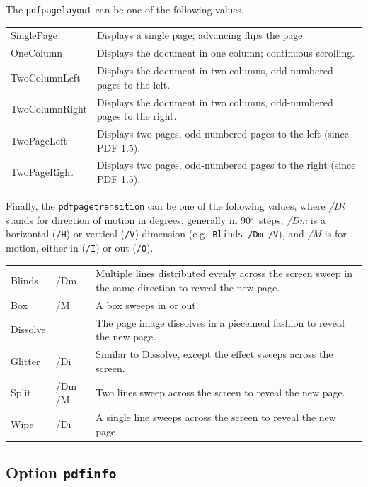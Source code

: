\documentclass[pdftex]{article}
\begin{document}
The \texttt{pdfpagelayout} can be one of the following values.

\noindent\begin{longtable}{>{\ttfamily}lp{10cm}}
SinglePage     & Displays a single page; advancing flips the page \\
OneColumn      & Displays the document in one column; continuous scrolling. \\
TwoColumnLeft  & Displays the document in two columns, odd-numbered pages to the left. \\
TwoColumnRight & Displays the document in two columns, odd-numbered pages to the right.\\
TwoPageLeft    & Displays two pages, odd-numbered pages to the left (since PDF 1.5).\\
TwoPageRight   & Displays two pages, odd-numbered pages to the right (since PDF 1.5).
\end{longtable}

Finally, the \texttt{pdfpagetransition} can be one of the following
values, where \textit{/Di} stands for direction of motion in degrees,
generally in 90$^{\circ}$\ steps, \textit{/Dm} is a horizontal
(\texttt{/H}) or vertical (\texttt{/V}) dimension (e.g.\ \texttt{Blinds
/Dm /V}), and \textit{/M} is for motion, either in (\texttt{/I}) or out
(\texttt{/O}).

\noindent\begin{longtable}{>{\ttfamily}llp{8.5cm}}
Blinds   & /Dm    & Multiple lines distributed evenly across the screen sweep in the same direction to reveal the new
                    page. \\
Box      & /M     & A box sweeps in or out. \\
Dissolve &        & The page image dissolves in a piecemeal fashion to reveal the new page. \\
Glitter  & /Di    & Similar to Dissolve, except the effect sweeps across the screen. \\
Split    & /Dm /M & Two lines sweep across the screen to reveal the new page. \\
Wipe     & /Di    & A single line sweeps across the screen to reveal the new page.
\end{longtable}

\subsection{Option \texttt{pdfinfo}}
\end{document}
